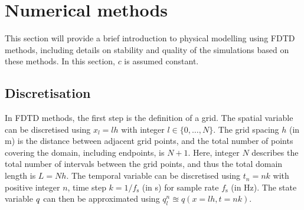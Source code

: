 
\section{Numerical methods}\label{sec:FDTD}
This section will provide a brief introduction to physical modelling using FDTD methods, including details on stability and quality of the simulations based on these methods. In this section, $c$ is assumed constant.

\subsection{Discretisation}
In FDTD methods, the first step is the definition of a grid. The spatial variable can be discretised using $x_l = lh$ %
with integer $l \in \{0, \hdots, N\}$. The grid spacing $h$ (in m) is the distance between adjacent grid points, and the total number of points covering the domain, including endpoints, is $N + 1$. Here, integer $N$ describes the total number of intervals between the grid points, and thus the total domain length is $L=Nh$.
The temporal variable can be discretised using $t_n = nk$ with positive integer $n$, time step $k = 1/f_\text{s}$ (in s) for sample rate $f_\text{s}$ (in Hz). The state variable $q$ can then be approximated using 
$q_{l}^{n}\approxeq q(x=lh,t=nk)$. 

